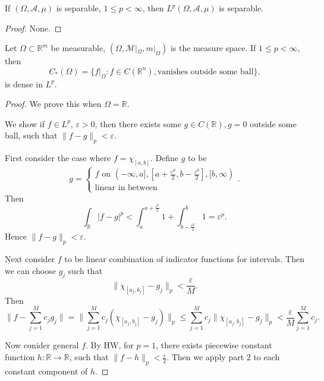 \begin{theorem}
	If $(\Omega, \mathcal{A}, \mu)$ is separable, $1 \le p < \infty $, then $L^p(\Omega, \mathcal{A}, \mu)$ is separable.
\end{theorem}
\begin{proof}
	None.
\end{proof}

\begin{theorem}
	Let $\Omega \subset \mathbb{R}^m$ be measurable, $(\Omega, \mathcal{M}|_\Omega, m|_\Omega)$ is the measure space. If $1 \le p < \infty $, then 
	\[
		C_* (\Omega) = \{f|_\Omega: f \in C(\mathbb{R}^n), \text{vanishes outside some ball}\} 
	.\] 
	is dense in $L^p$.
\end{theorem}
\begin{proof}
	We prove this when $\Omega = \mathbb{R}$.

	We show if $f \in L^p$, $\varepsilon>0$, then there exists some $g \in C(\mathbb{R}), g = 0$ outside some ball, such that $\|f - g\|_p < \varepsilon$.

	First consider the case where $f = \chi_{[a,b]}$. Define $g$ to be
	\[
		g = 
		\begin{cases}
			f \text{ on } (-\infty , a], [a + \frac{\varepsilon^p}{2}, b - \frac{\varepsilon^p}{2}], [b, \infty )\\
			\text{linear in between}
		\end{cases}
	.\] 
	Then
	\[
		\int_{\mathbb{R}}|f - g|^p
		< 
		\int _a^{a + \frac{\varepsilon^p}{2}} 1 + 
		\int _{b - \frac{\varepsilon^p}{2}}^b 1
		= \varepsilon^p
	.\] 
	Hence $\|f - g\|_p < \varepsilon$.

	Next consider $f$ to be linear combination of indicator functions for intervals. Then we can choose $g_j$ such that
	\[
		\|\chi_{[a_j, b_j]} - g_j\|_p < \frac{\varepsilon}{M}
	.\] 
	Then
	\[
		\|f - \sum_{j=1}^{M} c_j g_j\| = \|\sum_{j=1}^{M} c_j(\chi_{[a_j, b_j]} - g_j)\|_p \le \sum_{j=1}^{M} c_j\| \chi_{[a_j, b_j]} - g_j\|_p < \frac{\varepsilon}{M} \sum_{j=1}^{M} c_j
	.\] 

	Now conider general $f$. By HW, for $p = 1$, there exists piecewise constant function $h: \mathbb{R} \to  \mathbb{R}$, such that $\| f - h \|_p < \frac{\varepsilon}{2}$. Then we apply part 2 to each constant component of $h$.
\end{proof}

